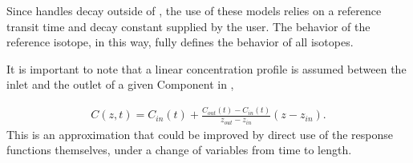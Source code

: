 Since \Cyclus handles decay outside of \Cyder, the use of these models relies on a 
reference transit time and decay constant supplied by the user. The behavior of 
the reference isotope, in this way, fully defines the behavior of all isotopes.

It is important to note that a linear concentration profile is assumed between 
the inlet and the outlet of a given Component in \Cyder,

\begin{align}
  C(z,t) = C_{in}(t)  + \frac{C_{out}(t) - C_{in}(t)}{z_{out} - z_{in}}(z-z_{in}).
\end{align}
This is an approximation that could be improved by direct use of the response 
functions themselves, under a change of variables from time to length. 

